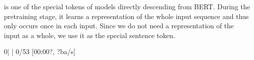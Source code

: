 \documentclass[letterpaper,10pt,english]{jupyterBook}
\begin{document}
\sphinxAtStartPar
\sphinxcode{\sphinxupquote{{[}CLS{]}}} is one of the special tokens of models directly descending from BERT. During the pretraining stage, it learns a representation of the whole input sequence and thus only occurs once in each input.
Since we do not need a representation of the input as a whole, we use it as the special sentence token.
\begin{sphinxVerbatimInput}

\begin{sphinxVerbatim}[commandchars=\\\{\}]
  
\end{sphinxVerbatim}
\end{sphinxVerbatimInput}
\begin{sphinxVerbatimInput}

\begin{sphinxVerbatim}[commandchars=\\\{\}]
   
\end{sphinxVerbatim}
\end{sphinxVerbatimInput}
\begin{sphinxVerbatimOutput}

\begin{sphinxVerbatim}[commandchars=\\\{\}]
  0\PYGZpc{}|          | 0/53 [00:00\PYGZlt{}?, ?ba/s]
\end{sphinxVerbatim}
\end{sphinxVerbatimOutput}
\end{document}
